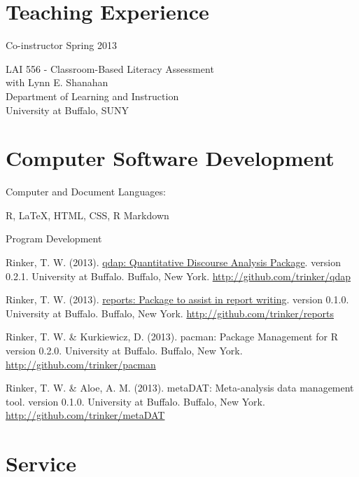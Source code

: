 \section{Teaching Experience}

Co-instructor \hfill {Spring 2013}
\begin{innerlist}
\item[] LAI 556 - Classroom-Based Literacy Assessment\\
        with Lynn E. Shanahan\\
        Department of Learning and Instruction\\
        University at Buffalo, SUNY
\end{innerlist}

\section{Computer Software Development}
Computer and Document Languages:
%
\begin{innerlist}
    \item R, \LaTeX, HTML, CSS, R Markdown 
\end{innerlist}

\halfblankline

Program Development
\begin{innerlist}
    \item Rinker, T. W. (2013). \href{http://cran.r-project.org/web/packages/qdap/index.html}{qdap: Quantitative Discourse Analysis Package}. version 0.2.1. University at Buffalo. Buffalo, New York. \url{http://github.com/trinker/qdap}
    \item Rinker, T. W. (2013). \href{http://cran.r-project.org/web/packages/reports/index.html}{reports: Package to assist in report writing}. version 0.1.0. University at Buffalo. Buffalo, New York. \url{http://github.com/trinker/reports}
    \item Rinker, T. W. \& Kurkiewicz, D. (2013). pacman: Package Management for R version 0.2.0. University at Buffalo. Buffalo, New York. \url{http://github.com/trinker/pacman}
    \item Rinker, T. W. \& Aloe, A. M. (2013). metaDAT: Meta-analysis data management tool. version 0.1.0. University at Buffalo. Buffalo, New York. \\ \url{http://github.com/trinker/metaDAT}
\end{innerlist}

\section{Service}

